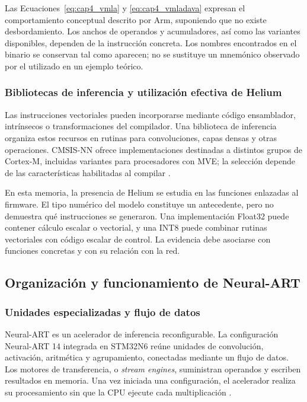 Las Ecuaciones~\ref{eq:cap4_vmla} y \ref{eq:cap4_vmladava} expresan el comportamiento conceptual descrito por Arm, suponiendo que no existe desbordamiento. Los anchos de operandos y acumuladores, así como las variantes disponibles, dependen de la instrucción concreta. Los nombres encontrados en el binario se conservan tal como aparecen; no se sustituye un mnemónico observado por el utilizado en un ejemplo teórico.

\subsubsection{Bibliotecas de inferencia y utilización efectiva de Helium}
Las instrucciones vectoriales pueden incorporarse mediante código ensamblador, intrínsecos o transformaciones del compilador. Una biblioteca de inferencia organiza estos recursos en rutinas para convoluciones, capas densas y otras operaciones. CMSIS-NN ofrece implementaciones destinadas a distintos grupos de Cortex-M, incluidas variantes para procesadores con MVE; la selección depende de las características habilitadas al compilar \cite{cap4_cmsisnn}.

En esta memoria, la presencia de Helium se estudia en las funciones enlazadas al firmware. El tipo numérico del modelo constituye un antecedente, pero no demuestra qué instrucciones se generaron. Una implementación Float32 puede contener cálculo escalar o vectorial, y una INT8 puede combinar rutinas vectoriales con código escalar de control. La evidencia debe asociarse con funciones concretas y con su relación con la red.

\subsection{Organización y funcionamiento de Neural-ART}\label{sec:cap4_neuralart}
\subsubsection{Unidades especializadas y flujo de datos}
Neural-ART es un acelerador de inferencia reconfigurable. La configuración Neural-ART 14 integrada en STM32N6 reúne unidades de convolución, activación, aritmética y agrupamiento, conectadas mediante un flujo de datos. Los motores de transferencia, o \textit{stream engines}, suministran operandos y escriben resultados en memoria. Una vez iniciada una configuración, el acelerador realiza su procesamiento sin que la CPU ejecute cada multiplicación \cite{cap4_stconcepts}.

